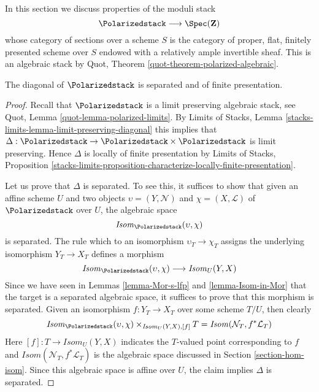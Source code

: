 \noindent
In this section we discuss properties of the moduli stack
$$
\Polarizedstack \longrightarrow \Spec(\mathbf{Z})
$$
whose category of sections over a scheme $S$ is the category of
proper, flat, finitely presented scheme over $S$ endowed
with a relatively ample invertible sheaf. This is an algebraic
stack by Quot, Theorem \ref{quot-theorem-polarized-algebraic}.

\begin{lemma}
\label{lemma-polarized-diagonal-separated-fp}
The diagonal of $\Polarizedstack$ is separated
and of finite presentation.
\end{lemma}

\begin{proof}
Recall that $\Polarizedstack$ is a limit preserving algebraic stack, see
Quot, Lemma \ref{quot-lemma-polarized-limits}.
By Limits of Stacks, Lemma \ref{stacks-limits-lemma-limit-preserving-diagonal}
this implies that
$\Delta : \Polarizedstack \to \Polarizedstack \times \Polarizedstack$
is limit preserving. Hence $\Delta$ is locally of finite presentation
by Limits of Stacks, Proposition
\ref{stacks-limits-proposition-characterize-locally-finite-presentation}.

\medskip\noindent
Let us prove that $\Delta$ is separated. To see this, it suffices to show
that given an affine scheme $U$ and two objects
$\upsilon = (Y, \mathcal{N})$ and $\chi = (X, \mathcal{L})$
of $\Polarizedstack$ over $U$, the algebraic
space
$$
\mathit{Isom}_{\Polarizedstack}(\upsilon, \chi)
$$
is separated. The rule which to an isomorphism $\upsilon_T \to \chi_T$
assigns the underlying isomorphism $Y_T \to X_T$ defines a morphism
$$
\mathit{Isom}_{\Polarizedstack}(\upsilon, \chi)
\longrightarrow
\mathit{Isom}_U(Y, X)
$$
Since we have seen in Lemmas \ref{lemma-Mor-s-lfp} and
\ref{lemma-Isom-in-Mor} that the target is
a separated algebraic space, it suffices to prove that this morphism
is separated. Given an isomorphism $f : Y_T \to X_T$
over some scheme $T/U$, then clearly
$$
\mathit{Isom}_{\Polarizedstack}(\upsilon, \chi)
\times_{\mathit{Isom}_U(Y, X), [f]} T
=
\mathit{Isom}(\mathcal{N}_T, f^*\mathcal{L}_T)
$$
Here $[f] : T \to \mathit{Isom}_U(Y, X)$ indicates the $T$-valued
point corresponding to $f$ and
$\mathit{Isom}(\mathcal{N}_T, f^*\mathcal{L}_T)$
is the algebraic space discussed in Section \ref{section-hom-isom}.
Since this algebraic space is affine over $U$, the claim implies
$\Delta$ is separated.


\end{proof}
